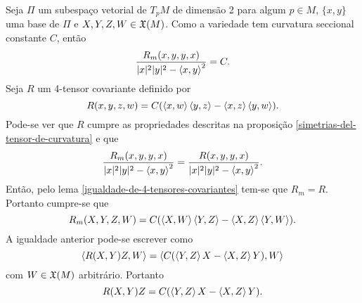 \begin{demonstracao}
	Seja $\Pi$ um subespaço vetorial de $T_p M$ de dimensão 2 para algum $p \in M$, $\{x,y\}$ uma base de $\Pi$ e $X,Y,Z,W \in \mathfrak{X}(M)$. Como a variedade tem curvatura seccional constante $C$, então
	\begin{equation*}
		\frac{R_m(x,y,y,x)}{|x|^2 |y|^2 - \left\langle x,y \right\rangle^2} = C.
	\end{equation*}
	Seja $R$ um 4-tensor covariante definido por
	\begin{equation*}
		R(x,y,z,w) = C (\left\langle x,w \right\rangle \left\langle y,z \right\rangle - \left\langle x,z \right\rangle \left\langle y,w \right\rangle).
	\end{equation*}
	Pode-se ver que $R$ cumpre as propriedades descritas na proposição \ref{simetrias-del-tensor-de-curvatura} e que
	\begin{equation*}
		\frac{R_m(x,y,y,x)}{|x|^2 |y|^2 - \left\langle x,y \right\rangle^2} = \frac{R(x,y,y,x)}{|x|^2 |y|^2 - \left\langle x,y \right\rangle^2}.
	\end{equation*}
	Então, pelo lema \ref{igualdade-de-4-tensores-covariantes} tem-se que $R_m = R$. Portanto cumpre-se que
	\begin{equation*}
		R_m(X,Y,Z,W) = C(\left\langle X,W \right\rangle \left\langle Y,Z \right\rangle - \left\langle X,Z \right\rangle \left\langle Y,W \right\rangle).
	\end{equation*}
	A igualdade anterior pode-se escrever como
	\begin{equation*}
		\left\langle R(X,Y)Z,W \right\rangle =  \left\langle C(\left\langle Y,Z \right\rangle X - \left\langle X,Z \right\rangle Y),W \right\rangle
	\end{equation*}
	com $W \in \mathfrak{X}(M)$ arbitrário. Portanto
	\begin{equation*}
		R(X,Y)Z =  C(\left\langle Y,Z \right\rangle X - \left\langle X,Z \right\rangle Y).
	\end{equation*}
\end{demonstracao}